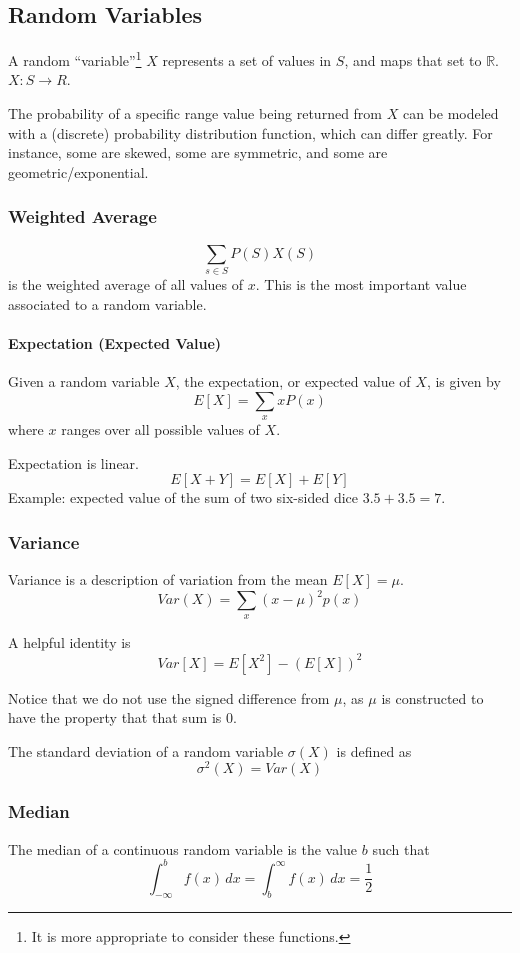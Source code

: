 \documentclass{article}
\begin{document}
\subsection{Random Variables}
A random ``variable''\footnote{It is more appropriate to consider these functions.} $X$ represents a set of values in $S$, and maps that set to $\mathbb{R}$.  $X: S \to R$.

The probability of a specific range value being returned from $X$ can be modeled with a (discrete) probability distribution function, which can differ greatly.
For instance, some are skewed, some are symmetric, and some are geometric/exponential.

\subsubsection{Weighted Average} \label{expected}
$$\sum_{s \in S} P(S)X(S)$$ is the weighted average of all values of $x$. This is the most important value associated to a random variable.

\paragraph{Expectation (Expected Value)} Given a random variable $X$, the expectation, or expected value of $X$, is given by
$$E\left[X\right]=\sum_x xP(x)$$ where $x$ ranges over all possible values of $X$.

Expectation is linear. $$E\left[X+Y\right] = E\left[X\right] + E\left[Y\right]$$
Example: expected value of the sum of two six-sided dice $3.5 + 3.5 = 7$.

\subsubsection{Variance} \label{variance}
Variance is a description of variation from the mean $E[X] = \mu$.
$$Var(X) = \sum_x\left(x-\mu\right)^2p(x)$$

A helpful identity is  $$Var[X] = E[X^2] - \left(E[X]\right)^2$$

Notice that we do not use the signed difference from $\mu$, as $\mu$ is constructed to have the property that that sum is $0$.

The standard deviation of a random variable $\sigma(X)$ is defined as
$$\sigma^2(X) = Var(X)$$

\subsubsection{Median}
The median of a continuous random variable is the value $b$ such that
$$\int_{-\infty}^b f(x)\,dx = \int_b^\infty f(x)\,dx = \frac{1}{2}$$
\end{document}
